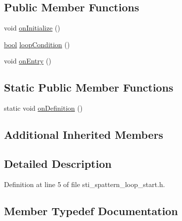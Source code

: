 \subsection*{Public Member Functions}
\begin{DoxyCompactItemize}
\item 
void \hyperlink{structsm__dance__bot_1_1s__pattern__states_1_1StiSPatternLoopStart_a3fade13d5ef2d408f1b9606c253299d3}{on\+Initialize} ()
\item 
\hyperlink{classbool}{bool} \hyperlink{structsm__dance__bot_1_1s__pattern__states_1_1StiSPatternLoopStart_a6ee8949dad84ea1906ec16f209bac199}{loop\+Condition} ()
\item 
void \hyperlink{structsm__dance__bot_1_1s__pattern__states_1_1StiSPatternLoopStart_a1dccbb9590834aaec90d07dedf0c6d1f}{on\+Entry} ()
\end{DoxyCompactItemize}
\subsection*{Static Public Member Functions}
\begin{DoxyCompactItemize}
\item 
static void \hyperlink{structsm__dance__bot_1_1s__pattern__states_1_1StiSPatternLoopStart_a482d93e73c8c44c40a231f63316f8f27}{on\+Definition} ()
\end{DoxyCompactItemize}
\subsection*{Additional Inherited Members}


\subsection{Detailed Description}


Definition at line 5 of file sti\+\_\+spattern\+\_\+loop\+\_\+start.\+h.



\subsection{Member Typedef Documentation}
